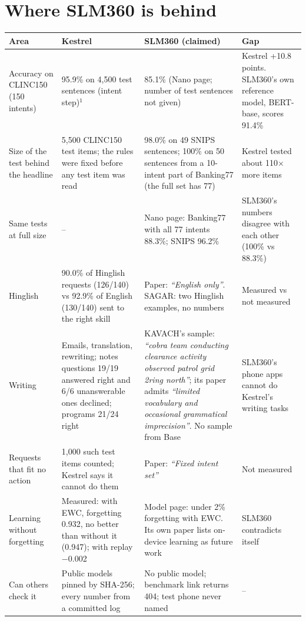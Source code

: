 \documentclass[11pt,a4paper]{article}
\newcommand{\quoted}[1]{\textit{``#1''}}
\begin{document}
\section{Where SLM360 is behind}

\begin{center}
\begin{tabularx}{\textwidth}{@{}P{3.1cm}LLP{2.6cm}@{}}
\toprule
\textbf{Area} & \textbf{Kestrel} & \textbf{SLM360 (claimed)} & \textbf{Gap} \\
\midrule
Accuracy on CLINC150 (150 intents) & 95.9\% on 4,500 test sentences (intent step)$^{1}$ & 85.1\% (Nano page; number
of test sentences not given) & Kestrel +10.8 points. SLM360's own reference model, BERT-base, scores 91.4\% \\
Size of the test behind the headline & 5,500 CLINC150 test items; the rules were fixed before any test item was read
& 98.0\% on 49 SNIPS sentences; 100\% on 50 sentences from a 10-intent part of Banking77 (the full set has 77) &
Kestrel tested about 110$\times$ more items \\
Same tests at full size & -- & Nano page: Banking77 with all 77 intents 88.3\%; SNIPS 96.2\% & SLM360's numbers
disagree with each other (100\% vs 88.3\%) \\
Hinglish & 90.0\% of Hinglish requests (126/140) vs 92.9\% of English (130/140) sent to the right skill & Paper: \quoted{English
only}. SAGAR: two Hinglish examples, no numbers & Measured vs not measured \\
Writing & Emails, translation, rewriting; notes questions 19/19 answered right and 6/6 unanswerable ones declined;
programs 21/24 right & KAVACH's sample: \quoted{cobra team conducting clearance activity observed patrol grid 2ring
north}; its paper admits \quoted{limited vocabulary and occasional grammatical imprecision}. No sample from Base &
SLM360's phone apps cannot do Kestrel's writing tasks \\
Requests that fit no action & 1,000 such test items counted; Kestrel says it cannot do them & Paper: \quoted{Fixed
intent set} & Not measured \\
Learning without forgetting & Measured: with EWC, forgetting 0.932, no better than without it (0.947); with replay
$-$0.002 & Model page: under 2\% forgetting with EWC. Its own paper lists on-device learning as future work & SLM360
contradicts itself \\
Can others check it & Public models pinned by SHA-256; every number from a committed log & No public model; benchmark
link returns 404; test phone never named & -- \\
\bottomrule
\end{tabularx}
\end{center}
\end{document}

